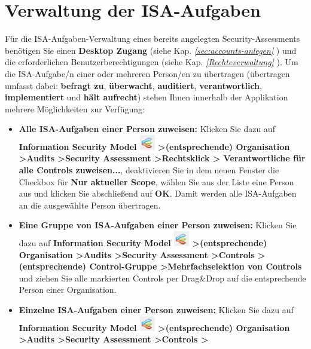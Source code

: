 \documentclass[a4paper,10pt]{book}
\begin{document}
\section{Verwaltung der ISA-Aufgaben}
Für die ISA-Aufgaben-Verwaltung eines bereits angelegten Security-Assessments benötigen Sie einen \textbf{Desktop Zugang}
(siehe Kap. {\em \ref{sec:accounts-anlegen} }) und die erforderlichen Benutzerberechtigungen (siehe Kap. {\em \ref{Rechteverwaltung} }).
Um die ISA-Aufgabe/n einer oder mehreren Person/en zu übertragen (übertragen umfasst dabei: \textbf{befragt zu}, \textbf{überwacht}, \textbf{auditiert},
\textbf{verantwortlich}, \textbf{implementiert} und \textbf{hält aufrecht}) stehen Ihnen innerhalb der Applikation mehrere Möglichkeiten zur Verfügung:
\begin{itemize}
\item \textbf{Alle ISA-Aufgaben einer Person zuweisen:} Klicken Sie dazu auf \textbf{Information Security Model
\includegraphics[height=2ex]{Icon/Informationssicherheitsmodell.png} \textgreater (entsprechende) Organisation \textgreater Audits \textgreater Security Assessment \textgreater Rechtsklick \textgreater
Verantwortliche für alle Controls zuweisen...}, deaktivieren Sie in dem neuen Fenster die Checkbox für \textbf{Nur aktueller Scope},
wählen Sie aus der Liste eine Person aus und klicken Sie abschließend auf \textbf{OK}. Damit werden alle ISA-Aufgaben an die ausgewählte Person übertragen.
\item \textbf{Eine Gruppe von ISA-Aufgaben einer Person zuweisen:} Klicken Sie dazu auf \textbf{Information Security Model
\includegraphics[height=2ex]{Icon/Informationssicherheitsmodell.png} \textgreater (entsprechende) Organisation \textgreater Audits \textgreater Security Assessment \textgreater Controls \textgreater
(entsprechende) Control-Gruppe \textgreater Mehrfachselektion von Controls} und ziehen Sie alle markierten Controls per Drag\&Drop auf die entsprechende Person
einer Organisation.
\item \textbf{Einzelne ISA-Aufgaben einer Person zuweisen:} Klicken Sie dazu auf \textbf{Information Security Model
\includegraphics[height=2ex]{Icon/Informationssicherheitsmodell.png} \textgreater (entsprechende) Organisation \textgreater Audits \textgreater Security Assessment \textgreater Controls \textgreater
}
\end{itemize}
\end{document}
